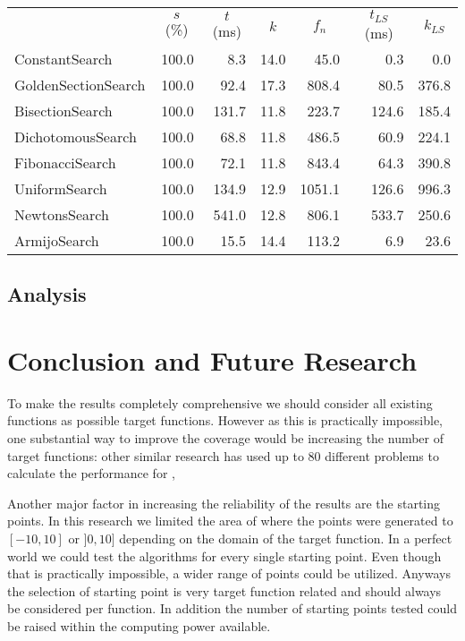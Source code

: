 \documentclass[a4paper,english,titlepage,12pt]{article}
\begin{document}
\begin{center}
\label{tab:performance_results_NegativeEntropy}
\begin{tabular}{|l|r|r|r|r|r|r|}
\hline
\rowcolor{gray!25}
\multicolumn{1}{|c|}{Line Search Name} & \multicolumn{1}{c|}{$s$ (\%)} & \multicolumn{1}{c|}{$t$ (ms)} & \multicolumn{1}{c|}{$k$} & \multicolumn{1}{c|}{$f_n$} & \multicolumn{1}{c|}{$t_{LS}$ (ms)} & \multicolumn{1}{c|}{$k_{LS}$} \\
ConstantSearch & 100.0 & 8.3 & 14.0 & 45.0 & 0.3 & 0.0 \\
GoldenSectionSearch & 100.0 & 92.4 & 17.3 & 808.4 & 80.5 & 376.8 \\
BisectionSearch & 100.0 & 131.7 & 11.8 & 223.7 & 124.6 & 185.4 \\
DichotomousSearch & 100.0 & 68.8 & 11.8 & 486.5 & 60.9 & 224.1 \\
FibonacciSearch & 100.0 & 72.1 & 11.8 & 843.4 & 64.3 & 390.8 \\
UniformSearch & 100.0 & 134.9 & 12.9 & 1051.1 & 126.6 & 996.3 \\
NewtonsSearch & 100.0 & 541.0 & 12.8 & 806.1 & 533.7 & 250.6 \\
ArmijoSearch & 100.0 & 15.5 & 14.4 & 113.2 & 6.9 & 23.6 \\

\hline
\end{tabular}
\end{center}


\subsection{Analysis}


\section{Conclusion and Future Research}


To make the results completely comprehensive we should consider all existing functions as possible target functions. However as this is practically impossible, one substantial way to improve the coverage would be increasing the number of target functions: other similar research has used up to 80 different problems to calculate the performance for \cite{monotone_line_search_performance},

Another major factor in increasing the reliability of the results are the starting points. In this research we limited the area of where the points were generated to $[-10, 10]$ or $]0, 10]$ depending on the domain of the target function. In a perfect world we could test the algorithms for every single starting point. Even though that is practically impossible, a wider range of points could be utilized. Anyways the selection of starting point is very target function related and should always be considered per function. In addition the number of starting points tested could be raised within the computing power available.
\end{document}
